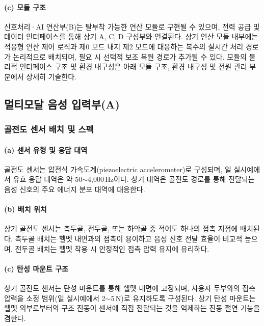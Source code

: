 \documentclass{article}
\DeclareRobustCommand{\codexedit}[1]{\textcolor{customorange}{#1}}
\begin{document}
\paragraph{(c) 모듈 구조}

\codexedit{신호처리·AI 연산부(B)는 탈부착 가능한 연산 모듈로 구현될 수 있으며, 전력 공급 및 데이터 인터페이스를 통해 상기 A, C, D 구성부와 연결된다. 상기 연산 모듈 내부에는 적응형 연산 제어 로직과 제0 모드 내지 제2 모드에 대응하는 복수의 실시간 처리 경로가 논리적으로 배치되며, 필요 시 선택적 보조 복원 경로가 추가될 수 있다. 모듈의 물리적 인터페이스 구조 및 환경 내구성은 아래 모듈 구조, 환경 내구성 및 전원 관리 부분에서 상세히 기술한다.}

\subsection{멀티모달 음성 입력부(A)}

\subsubsection{골전도 센서 배치 및 스펙}

\paragraph{(a) 센서 유형 및 응답 대역}

골전도 센서는 압전식 가속도계(piezoelectric accelerometer)로 구성되며, 일 실시예에서 유효 응답 대역은 약 50$\sim$4{,}000\,Hz이다. 상기 대역은 골전도 경로를 통해 전달되는 음성 신호의 주요 에너지 분포 대역에 대응한다.

\paragraph{(b) 배치 위치}

상기 골전도 센서는 측두골, 전두골, 또는 하악골 중 적어도 하나의 접촉 지점에 배치된다. 측두골 배치는 헬멧 내면과의 접촉이 용이하고 음성 신호 전달 효율이 비교적 높으며, 전두골 배치는 헬멧 착용 시 안정적인 접촉 압력 유지에 유리하다.

\paragraph{(c) 탄성 마운트 구조}

상기 골전도 센서는 탄성 마운트를 통해 헬멧 내면에 고정되며, 사용자 두부와의 접촉 압력을 소정 범위(일 실시예에서 2$\sim$5\,N)로 유지하도록 구성된다. 상기 탄성 마운트는 헬멧 외부로부터의 구조 진동이 센서에 직접 전달되는 것을 억제하는 진동 절연 기능을 겸한다.
\end{document}
